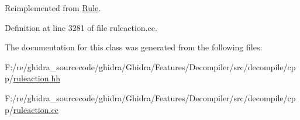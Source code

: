 Reimplemented from \mbox{\hyperlink{class_rule_a4023bfc7825de0ab866790551856d10e}{Rule}}.



Definition at line 3281 of file ruleaction.\+cc.



The documentation for this class was generated from the following files\+:\begin{DoxyCompactItemize}
\item 
F\+:/re/ghidra\+\_\+sourcecode/ghidra/\+Ghidra/\+Features/\+Decompiler/src/decompile/cpp/\mbox{\hyperlink{ruleaction_8hh}{ruleaction.\+hh}}\item 
F\+:/re/ghidra\+\_\+sourcecode/ghidra/\+Ghidra/\+Features/\+Decompiler/src/decompile/cpp/\mbox{\hyperlink{ruleaction_8cc}{ruleaction.\+cc}}\end{DoxyCompactItemize}
